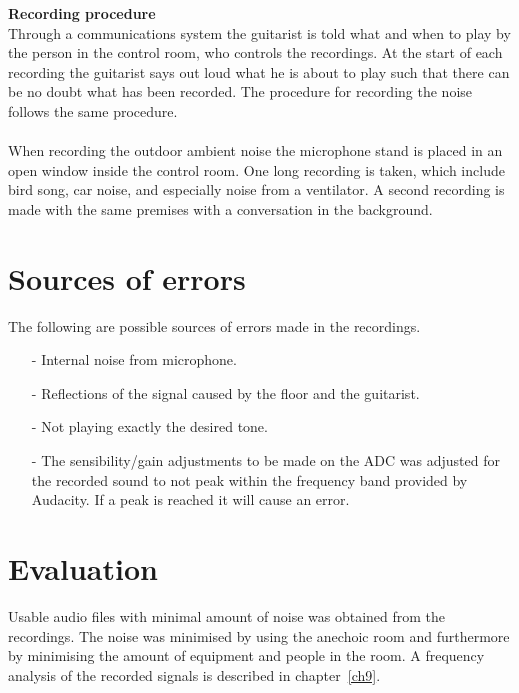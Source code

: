 \textbf{Recording procedure}\\
Through a communications system the guitarist is told what and when to play by the person in the control room, who controls the recordings. At the start of each recording the guitarist says out loud what he is about to play such that there can be no doubt what has been recorded.
The procedure for recording the noise follows the same procedure.
\\ \\
When recording the outdoor ambient noise the microphone stand is placed in an open window inside the control room. One long recording is taken, which include bird song, car noise, and especially noise from a ventilator. A second recording is made with the same premises with a conversation in the background.

\section{Sources of errors}
The following are possible sources of errors made in the recordings.

\begin{itemize}
\item[-] Internal noise from microphone. 
\item[-] Reflections of the signal caused by the floor and the guitarist.
\item[-] Not playing exactly the desired tone.
\item[-] The sensibility/gain adjustments to be made on the ADC was adjusted for the recorded sound to not peak within the frequency band provided by Audacity. If a peak is reached it will cause an error.       
\end{itemize}

\section{Evaluation}
Usable audio files with minimal amount of noise was obtained from the recordings. The noise was minimised by using the anechoic room and furthermore by minimising the amount of equipment and people in the room.
A frequency analysis of the recorded signals is described in chapter~\ref{ch9}.

\clearpage